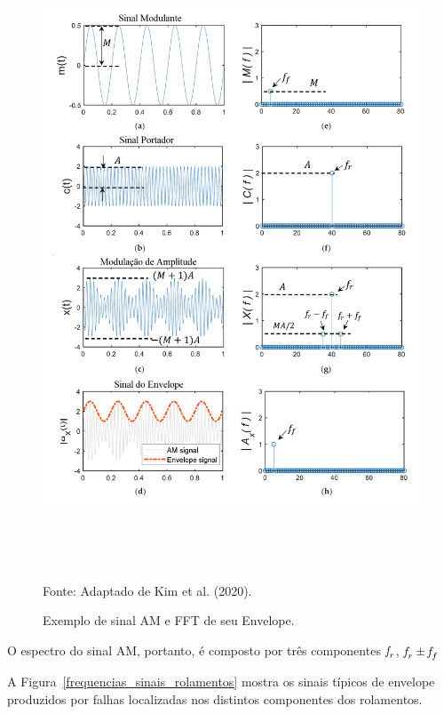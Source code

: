 \documentclass[
	12pt,				
	oneside,			
	a4paper,			
	english,			
	brazil,			
	]{abntex2ppgsi}
\newcommand{\f}{\mkern-2mu f\mkern-3mu}
\begin{document}
\begin{figure}[!htb]
\centering
\caption {Exemplo de sinal AM e FFT de seu Envelope.}
\includegraphics[width=\textwidth,height=190mm,keepaspectratio]{exemplo_AM_FFT} \\
Fonte: Adaptado de Kim et al. (2020).
\label{exemplo_AM_FFT}
\end{figure}

O espectro do sinal AM, portanto, é composto por três componentes ${\f}_r$, ${\f}_r \pm {\f}_f$ 

A Figura~\ref{frequencias_sinais_rolamentos} mostra os sinais típicos de envelope produzidos por falhas localizadas nos distintos componentes dos rolamentos. 
\end{document}
